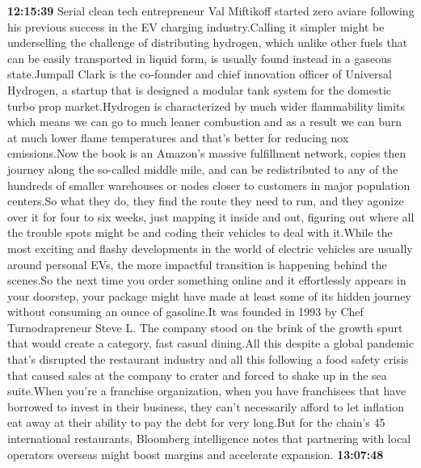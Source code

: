 \documentclass{article}%
\begin{document}
\textbf{12:15:39}%
Serial clean tech entrepreneur Val Miftikoff started zero aviare following his previous success in the EV charging industry.Calling it simpler might be underselling the challenge of distributing hydrogen, which unlike other fuels that can be easily transported in liquid form, is usually found instead in a gaseous state.Jumpall Clark is the co{-}founder and chief innovation officer of Universal Hydrogen, a startup that is designed a modular tank system for the domestic turbo prop market.Hydrogen is characterized by much wider flammability limits which means we can go to much leaner combustion and as a result we can burn at much lower flame temperatures and that's better for reducing nox emissions.Now the book is an Amazon's massive fulfillment network, copies then journey along the so{-}called middle mile, and can be redistributed to any of the hundreds of smaller warehouses or nodes closer to customers in major population centers.So what they do, they find the route they need to run, and they agonize over it for four to six weeks, just mapping it inside and out, figuring out where all the trouble spots might be and coding their vehicles to deal with it.While the most exciting and flashy developments in the world of electric vehicles are usually around personal EVs, the more impactful transition is happening behind the scenes.So the next time you order something online and it effortlessly appears in your doorstep, your package might have made at least some of its hidden journey without consuming an ounce of gasoline.It was founded in 1993 by Chef Turnodrapreneur Steve L. The company stood on the brink of the growth spurt that would create a category, fast casual dining.All this despite a global pandemic that's disrupted the restaurant industry and all this following a food safety crisis that caused sales at the company to crater and forced to shake up in the sea suite.When you're a franchise organization, when you have franchisees that have borrowed to invest in their business, they can't necessarily afford to let inflation eat away at their ability to pay the debt for very long.But for the chain's 45 international restaurants, Bloomberg intelligence notes that partnering with local operators overseas might boost margins and accelerate expansion.%
\textbf{13:07:48}%
\end{document}
